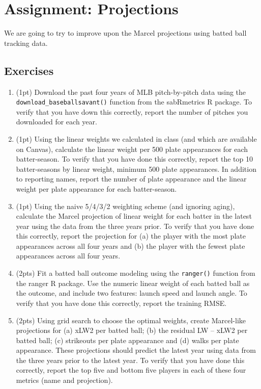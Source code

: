 \documentclass{article}
\begin{document}
  \section*{\sc Assignment: Projections}

    We are going to try to improve upon the Marcel projections using batted ball tracking data.

    \subsection*{\sc Exercises}

    \begin{enumerate}
      \item (1pt) Download the past four years of MLB pitch-by-pitch data using the \texttt{download\_baseballsavant()} function from the sabRmetrics R package. To verify that you have down this correctly, report the number of pitches you downloaded for each year.
      \item (1pt) Using the linear weights we calculated in class (and which are available on Canvas), calculate the linear weight per 500 plate appearances for each batter-season. To verify that you have done this correctly, report the top 10 batter-seasons by linear weight, minimum 500 plate appearances. In addition to reporting names, report the number of plate appearance and the linear weight per plate appearance for each batter-season.
      \item (1pt) Using the naive 5/4/3/2 weighting scheme (and ignoring aging), calculate the Marcel projection of linear weight for each batter in the latest year using the data from the three years prior. To verify that you have done this correctly, report the projection for (a) the player with the most plate appearances across all four years and (b) the player with the fewest plate appearances across all four years.
      \item (2pts) Fit a batted ball outcome modeling using the \texttt{ranger()} function from the ranger R package. Use the numeric linear weight of each batted ball as the outcome, and include two features: launch speed and launch angle. To verify that you have done this correctly, report the training RMSE.
      \item (2pts) Using grid search to choose the optimal weights, create Marcel-like projections for (a) xLW2 per batted ball; (b) the residual LW -- xLW2 per batted ball; (c) strikeouts per plate appearance and (d) walks per plate appearance. These projections should predict the latest year using data from the three years prior to the latest year. To verify that you have done this correctly, report the top five and bottom five players in each of these four metrics (name and projection).

\end{enumerate}
\end{document}
